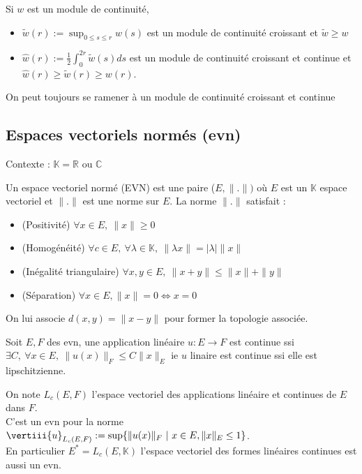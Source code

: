 \begin{remarque}
    Si $w$ est un module de continuité,
    \begin{itemize}
        \item $\tilde{w}(r):=\sup_{0\le s\le r} w(s)$ est un module de continuité croissant et $\tilde w\ge w$
        \item $\hat{w}(r):=\frac{1}{2} \int_0^{2r}\tilde{w}(s)ds$ est un module de continuité croissant et continue et $\hat{w}(r)\ge \tilde{w}(r)\ge w(r)$.
    \end{itemize}

    On peut toujours se ramener à un module de continuité croissant et continue
\end{remarque}

\subsection{Espaces vectoriels normés (evn)}
\noindent Contexte : $\mathbb{K}=\mathbb{R}$ ou $\mathbb{C}$
\begin{definition}
    Un espace vectoriel normé (EVN) est une paire ($E,\|.\|)$ où $E$ est un $\mathbb{K}$ espace vectoriel et $\|.\|$ est une norme sur $E$. La norme $\|.\|$ satisfait :
    \begin{itemize}
        \item (Positivité) $\forall x\in E,\ \|x\|\ge 0$
        \item (Homogénéité) $\forall c\in E,\ \forall  \lambda\in \mathbb{K},\ \|\lambda x\|=|\lambda|\|x\|$
        \item (Inégalité triangulaire) $\forall x,y \in E,\ \|x+y\|\le \|x\|+\|y\|$
        \item (Séparation) $\forall x \in E, \|x\| = 0 \Leftrightarrow x = 0$
    \end{itemize}
\end{definition}

On lui associe $d(x,y)=\|x-y\|$ pour former la topologie associée.

\begin{propriete}
    Soit $E,F$ des evn, une application linéaire $u:E\to F$ est continue ssi $\exists C,\ \forall x\in E,\ \|u(x)\|_F\le C\|x\|_E$ ie $u$ linaire est continue ssi elle est lipschitzienne.
\end{propriete}

On note $L_c(E,F)$ l'espace vectoriel des applications linéaire et continues de $E$ dans $F$.\\
C'est un evn pour la norme $\vertiii{u}_{L_c(E,F)}:=\sup\{\|u(x)\|_F\ |\ x\in E, \|x\|_E\le 1\} $. \\
En particulier $E^*=L_c(E,\mathbb{K})$ l'espace vectoriel des formes linéaires continues est aussi un evn.

